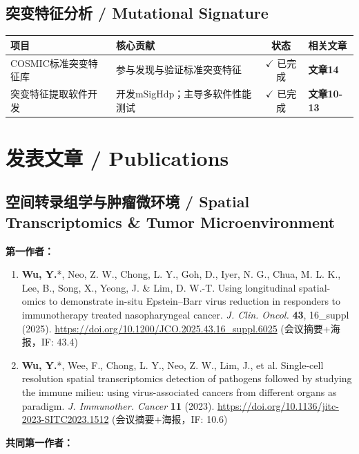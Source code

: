 \documentclass[11pt,a4paper]{article}
\newcommand{\urltext}[1]{\href{#1}{#1}}
\begin{document}
\subsection*{突变特征分析 / Mutational Signature}

\begin{longtable}{p{4.5cm}p{4.5cm}cp{2cm}}
\toprule
\textbf{项目} & \textbf{核心贡献} & \textbf{状态} & \textbf{相关文章} \\
\midrule
COSMIC标准突变特征库 & 参与发现与验证标准突变特征 & $\checkmark$ 已完成 & \textbf{文章14} \\
突变特征提取软件开发 & 开发mSigHdp；主导多软件性能测试 & $\checkmark$ 已完成 & \textbf{文章10-13} \\
\bottomrule
\end{longtable}

\section*{发表文章 / Publications}

\subsection*{空间转录组学与肿瘤微环境 / Spatial Transcriptomics \& Tumor Microenvironment}

\textbf{第一作者：}

\begin{enumerate}[leftmargin=*,nosep]
\item \textbf{Wu, Y.}*, Neo, Z. W., Chong, L. Y., Goh, D., Iyer, N. G., Chua, M. L. K., Lee, B., Song, X., Yeong, J. \& Lim, D. W.-T. Using longitudinal spatial-omics to demonstrate in-situ Epstein--Barr virus reduction in responders to immunotherapy treated nasopharyngeal cancer. \textit{J. Clin. Oncol.} \textbf{43}, 16\_suppl (2025). \urltext{https://doi.org/10.1200/JCO.2025.43.16\_suppl.6025} (会议摘要+海报，IF: 43.4)

\item \textbf{Wu, Y.}*, Wee, F., Chong, L. Y., Neo, Z. W., Lim, J., et al. Single-cell resolution spatial transcriptomics detection of pathogens followed by studying the immune milieu: using virus-associated cancers from different organs as paradigm. \textit{J. Immunother. Cancer} \textbf{11} (2023). \urltext{https://doi.org/10.1136/jitc-2023-SITC2023.1512} (会议摘要+海报，IF: 10.6)
\end{enumerate}

\textbf{共同第一作者：}
\end{document}
